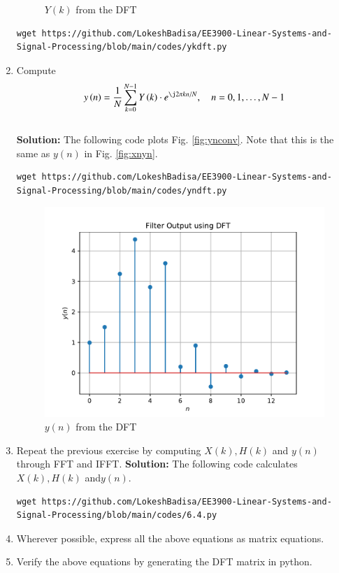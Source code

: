 \documentclass[journal,12pt,twocolumn]{IEEEtran}
\newcommand{\solution}{\noindent \textbf{Solution: }}
\providecommand{\brak}[1]{\ensuremath{\left(#1\right)}}
\numberwithin{equation}{section}
\renewcommand\thesection{\arabic{section}}
\begin{document}
\begin{enumerate}[label=\thesection.\arabic*]
\begin{figure}[!ht]
\caption{$Y(k)$ from the DFT}
\label{fig:yk}
\end{figure}
\begin{lstlisting}
wget https://github.com/LokeshBadisa/EE3900-Linear-Systems-and-Signal-Processing/blob/main/codes/ykdft.py
\end{lstlisting}
\item Compute
\begin{equation}
 y\brak{n}={\frac {1}{N}}\sum _{k=0}^{N-1}Y\brak{k}\cdot e^{\j 2\pi kn/N},\quad n = 0,1,\dots, N-1
\end{equation}
\\
\solution The following code plots Fig. \ref{fig:ynconv}. Note that this is the same as 
$y(n)$ in  Fig. 
\ref{fig:xnyn}. 
%
\begin{lstlisting}
wget https://github.com/LokeshBadisa/EE3900-Linear-Systems-and-Signal-Processing/blob/main/codes/yndft.py
\end{lstlisting}
\begin{figure}[!ht]
\centering
\includegraphics[width=\columnwidth]{./figs/yndft}
\caption{$y(n)$ from the DFT}
\label{fig:yndft}
\end{figure}

\item Repeat the previous exercise by computing $X(k), H(k)$ and $y(n)$ through FFT and 
IFFT.
\solution The following code calculates $X(k),H(k)$ and$ y(n)$.
\begin{lstlisting}
wget https://github.com/LokeshBadisa/EE3900-Linear-Systems-and-Signal-Processing/blob/main/codes/6.4.py
\end{lstlisting}
\item Wherever possible, express all the above equations as matrix equations.
\item Verify the above equations by generating the DFT matrix in python.
\end{enumerate}
%
\end{document}
